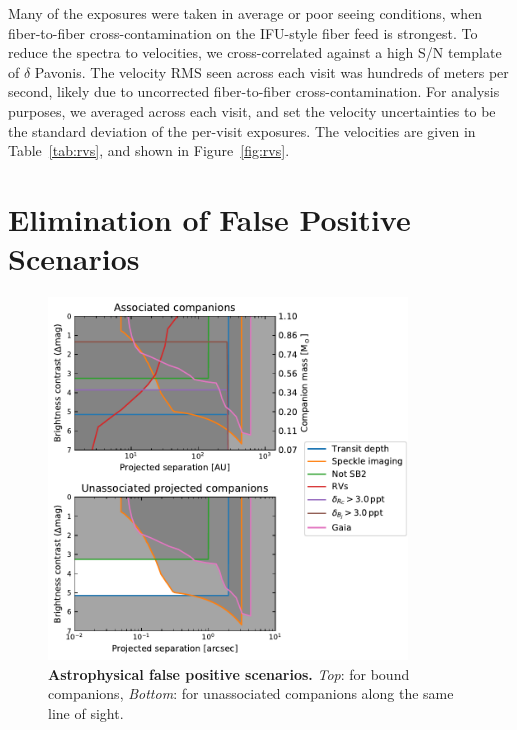 \documentclass[12pt,twocolumn,tighten]{aastex63}
\begin{document}
Many of the exposures were taken in average or poor seeing conditions,
when fiber-to-fiber cross-contamination on the IFU-style fiber feed is
strongest.  To reduce the spectra to velocities, we cross-correlated
against a high S/N template of $\delta$ Pavonis.  The velocity RMS
seen across each visit was hundreds of meters per second, likely due to
uncorrected fiber-to-fiber cross-contamination.  For
analysis purposes, we averaged across each visit, and set the velocity
uncertainties to be the standard deviation of the per-visit exposures.
The velocities are given in Table~\ref{tab:rvs}, and shown in
Figure~\ref{fig:rvs}.



\section{Elimination of False Positive Scenarios}
\label{sec:validation}

\begin{figure}[!t]
	\begin{center}
		\leavevmode
		\includegraphics[width=0.85\textwidth]{f4.pdf}
	\end{center}
	\vspace{-0.7cm}
	\caption{
		{\bf Astrophysical false positive scenarios.}
		{\it Top}: for bound companions,
		{\it Bottom}: for unassociated companions along the same line of
		sight.
		\label{fig:fpscenario}
	}
\end{figure}
\end{document}
